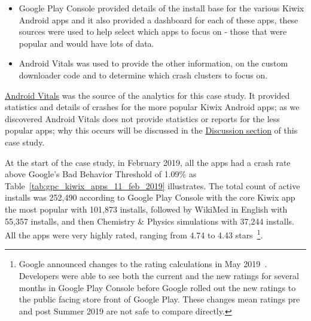 \begin{itemize}
    \item Google Play Console provided details of the install base for the various Kiwix Android apps and it also provided a dashboard for each of these apps, these sources were used to help select which apps to focus on - those that were popular and would have lots of data.
    \item Android Vitals was used to provide the other information, on the custom downloader code and to determine which crash clusters to focus on.
\end{itemize}


\href{glossary_android_vitals}{Android Vitals} was the source of the analytics for this case study. It provided statistics and details of crashes for the more popular Kiwix Android apps; as we discovered Android Vitals does not provide statistics or reports for the less popular apps; why this occurs will be discussed in the \href{case-study-kiwix-discussion}{Discussion section} of this case study. 


At the start of the case study, in February 2019, all the apps had a crash rate above Google's Bad Behavior Threshold of 1.09\% as Table~\ref{tab:gpc_kiwix_apps_11_feb_2019} illustrates. The total count of active installs was 252,490 according to Google Play Console with the core Kiwix app the most popular with 101,873 installs, followed by WikiMed in English with 55,357 installs, and then Chemistry \& Physics simulations with 37,244 installs. All the apps were very highly rated, ranging from 4.74 to 4.43 stars~\footnote{Google announced changes to the rating calculations in May 2019~\citep{androiddevelopersblog2019_io2019_whats_new_in_play}. Developers were able to see both the current and the new ratings for several months in Google Play Console before Google rolled out the new ratings to the public facing store front of Google Play. These changes mean ratings pre and post Summer 2019 are not safe to compare directly.}.

